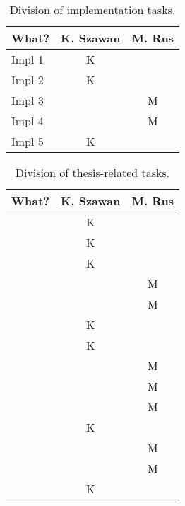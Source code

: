 
\begin{table}[h]
	\centering
	\begin{tabular}{l|c|c}
		What? & K. Szawan & M. Rus \\
		\hline
		Impl 1 & K & \\
		Impl 2 & K & \\
		Impl 3 & & M\\
		Impl 4 & & M\\
		Impl 5 & K & \\
	\end{tabular}
	\caption{Division of implementation tasks.}
	\label{tab:who-did-impl}
\end{table}

\begin{table}[h]
	\centering
	\begin{tabular}{l|c|c}
		What? & K. Szawan & M. Rus \\
		\hline
		\Cref{chap:introduction} & K & \\
		\Cref{sec:xmind} & K & \\
		\Cref{sec:android-theory} & K & \\
		\Cref{sec:scala} &  & M \\
		\Cref{sec:akka} &  & M \\
		\Cref{sec:requirements} & K  &  \\
		\Cref{sec:plan}  & K &  \\
		\Cref{subsec:component-android} &   & M \\
		\Cref{subsec:component-akka}   &   & M \\
		\Cref{subsec:data-repr}  &   & M \\
		\Cref{subsec:xmind-exchange}  & K  &  \\
		\Cref{subsec:android-akka-comm}  &   & M \\
		\Cref{subsec:subtree-recreation}  &   & M \\		
		\Cref{subsec:ui-mockups}  & K  &  \\
	\end{tabular}
	\caption{Division of thesis-related tasks.}
	\label{tab:who-did-docs}
\end{table}

